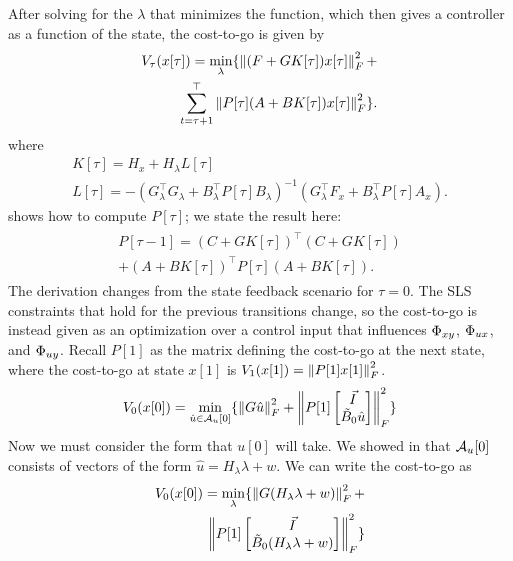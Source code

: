 After solving for the $\lambda$ that minimizes the function, which then gives a 
controller as a function of the state, the cost-to-go is given by
\begin{equation*}
    \begin{aligned}
        V_{\tau}(x[\tau]) = \min_{\lambda} \{ \left\lVert  (F + G K[\tau])x[\tau]  \right\rVert_F^2 + \\
        \sum_{t=\tau+1}^\top  \left\lVert  P[\tau] (A + BK[\tau])x[\tau]  \right\rVert_F^2 \}.
    \end{aligned}
\end{equation*}
where 
\begin{gather}
        K[\tau] = H_x + H_{\lambda} L[\tau] \label{eqn:Kt_H2} \\
        L[\tau] = -(G_{\lambda}^\top G_{\lambda}+B_{\lambda}^\top P[\tau]B_{\lambda})^{-1}(G_{\lambda}^\top  F_x +B_{\lambda}^\top  P[\tau]A_x). \nonumber
\end{gather}
\cite{tseng2020system} shows how to compute $P[\tau]$; we state the result here:
\begin{align}\label{eqn:update_p}
    \begin{gathered}
        P[\tau-1] = (C+GK[\tau])^\top (C+GK[\tau]) \\
    + (A+BK[\tau])^\top P[\tau](A+BK[\tau]).
    \end{gathered}
\end{align}
The derivation changes from the state feedback scenario for $\tau=0$. The SLS constraints 
that hold for the previous transitions change, so the cost-to-go is instead given as an optimization over
a control input that influences $\Phi_{xy}$, $\Phi_{ux}$, and $\Phi_{uy}$. Recall $P[1]$ as the matrix defining the cost-to-go
at the next state, where the cost-to-go at state $x[1]$ is $V_1(x[1]) = \left\lVert  P[1] x[1]  \right\rVert_F^2$.
\begin{equation*} %
    \begin{aligned}
        V_0(x[0]) = \min_{\hat{u} \in \Acal_u[0]} \{ \norm{ G \hat{u} }_F^2 + \norm{ P[1]\mat{\Vec{I} \\ \tilde{B}_0\hat{u}}  }_F^2 \}
    \end{aligned}
\end{equation*}
Now we must consider the form that $u[0]$ will take. We showed in  that 
$\mathcal{A}_u[0]$ consists of vectors of the form $\hat{u} = H_{\lambda}\lambda + w$. We can write the cost-to-go as
\begin{equation*}
    \begin{aligned}
        V_0(x[0]) = \min_{\lambda} \{ \left\lVert  G (H_{\lambda}\lambda + w)  \right\rVert_F^2 + \\
        \left\lVert  P[1]\begin{bmatrix}\Vec{I}\\ \tilde{B}_0(H_{\lambda}\lambda + w)\end{bmatrix}  \right\rVert_F^2 \}
    \end{aligned}
\end{equation*}
